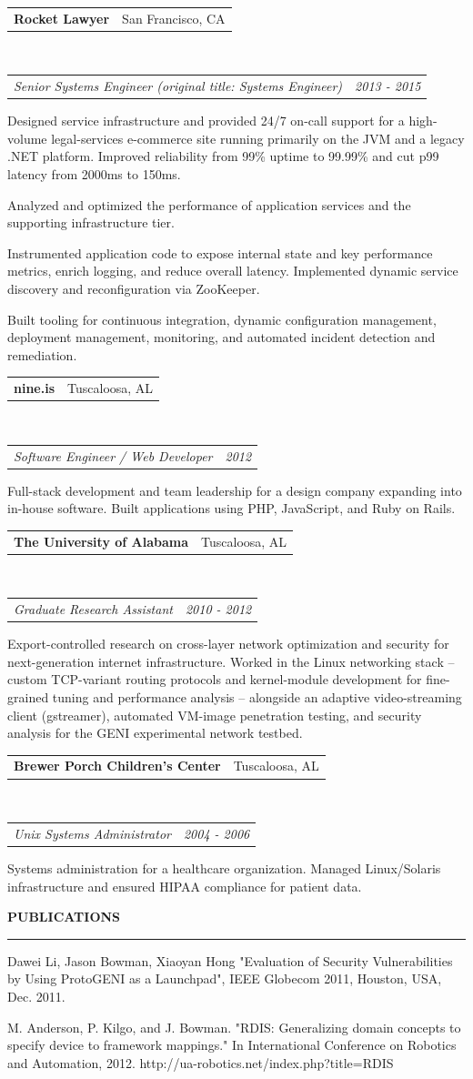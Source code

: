 \documentclass[11pt,letterpaper]{article}
\makeatletter
\newcommand{\header}[1]{%
  \vspace{6pt}%
  {\large\bfseries\color{accent}\MakeUppercase{#1}}\par\nobreak\vspace{-3pt}%
  {\color{accent}\rule{\linewidth}{0.9pt}}\par\nobreak\vspace{3pt}%
  \@afterheading}
\newcommand{\headerrow}[2]{%
  \begin{tabular*}{\linewidth}{@{}l@{\extracolsep{\fill}}r@{}}#1 & #2\end{tabular*}}
\newcommand{\employment}[5]{%
  \headerrow{\textbf{#1}}{\color{muted}#2}\\
  \headerrow{{\itshape\color{accent}#3}}{\color{muted}\itshape #4}
  \begin{itemize*}
    \item #5
  \end{itemize*}
}
\makeatother
\begin{document}
\employment{Rocket Lawyer}{San Francisco, CA}{Senior Systems Engineer (original
  title: Systems Engineer)}{2013 - 2015}{
Designed service infrastructure and provided 24/7 on-call support for a high-volume legal-services e-commerce site running primarily on the JVM and a legacy .NET platform. Improved reliability from 99\% uptime to 99.99\% and cut p99 latency from 2000ms to 150ms.
\item Analyzed and optimized the performance of application services and the supporting infrastructure tier.
\item Instrumented application code to expose internal state and key performance metrics, enrich logging, and reduce overall latency.
  Implemented dynamic service discovery and reconfiguration via ZooKeeper.
\item Built tooling for continuous integration, dynamic configuration
  management, deployment management, monitoring, and automated incident
  detection and remediation.
}

\employment{nine.is}{Tuscaloosa, AL}{Software Engineer / Web Developer}{2012}{
Full-stack development and team leadership for a design company expanding into in-house software. Built applications using PHP, JavaScript, and Ruby on Rails.
}

\employment{The University of Alabama}{Tuscaloosa, AL}{Graduate Research Assistant}{2010 - 2012}{
Export-controlled research on cross-layer network optimization and security for next-generation internet infrastructure. Worked in the Linux networking stack -- custom TCP-variant routing protocols and kernel-module development for fine-grained tuning and performance analysis -- alongside an adaptive video-streaming client (gstreamer), automated VM-image penetration testing, and security analysis for the GENI experimental network testbed.
}

\employment{Brewer Porch Children's Center}{Tuscaloosa, AL}{Unix Systems Administrator}{2004 - 2006}{
Systems administration for a healthcare organization. Managed Linux/Solaris infrastructure and ensured HIPAA compliance for patient data.
}

\vspace*{3pt}

\header{Publications}
\begin{itemize*}
\item Dawei Li, Jason Bowman, Xiaoyan Hong "Evaluation of Security Vulnerabilities by Using ProtoGENI as a Launchpad", IEEE Globecom 2011, Houston, USA, Dec. 2011.
\item M. Anderson, P. Kilgo, and J. Bowman. "RDIS: Generalizing domain concepts to specify device to framework mappings." In International Conference on Robotics and Automation, 2012. http://ua-robotics.net/index.php?title=RDIS
\end{itemize*}
\end{document}
